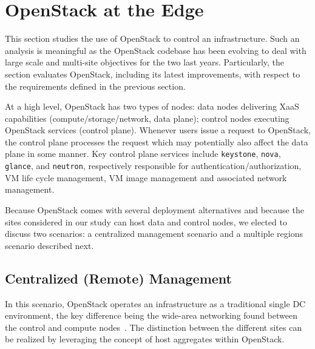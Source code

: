 \vspace*{-.1cm}
\section{OpenStack at the Edge}
\label{sec:system_design_considerations}
\vspace*{-.1cm}

%
This section studies the use of OpenStack to control an \edge
infrastructure. Such an analysis is meaningful as the OpenStack
codebase has been evolving to deal with large scale and multi-site
objectives for the two last years. Particularly, the section evaluates
OpenStack, including its latest improvements, with respect to the requirements
defined in the previous section.


At a high level, OpenStack has two types of nodes: data nodes
delivering XaaS capabilities (compute/storage/network, \ie data
plane); control nodes executing OpenStack services (\ie control
plane). Whenever users issue a request to OpenStack, the control
plane processes the request which may potentially also affect the data plane in some manner. 
Key control plane services include \verb|keystone|,
\verb|nova|, \verb|glance|, and \verb|neutron|, respectively responsible for 
authentication/authorization, VM life cycle management, VM image management and
associated network management.

Because OpenStack comes with several deployment alternatives and
because the \edge sites considered in our study can host data and
control nodes, we elected to discuss two scenarios:
a centralized management scenario and a multiple regions scenario described next.

\vspace*{-.3cm}
\subsection{Centralized (Remote) Management}
\label{subsec:centralized_os}
In this scenario, OpenStack operates an \edge infrastructure
as a traditional single DC environment, %
the key difference being the wide-area networking found between the
control and compute nodes~\cite{www:openstack-wanwide}. The
distinction between the different \edge sites can be realized by leveraging the
concept of host aggregates within OpenStack.


